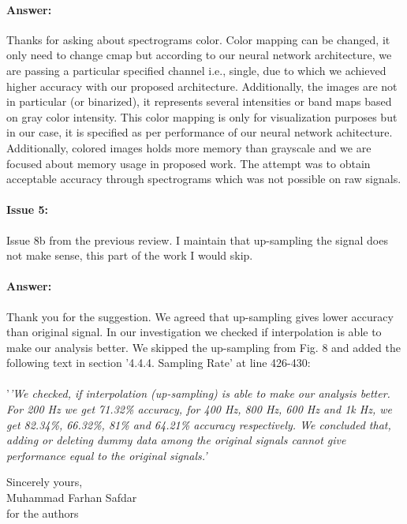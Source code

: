 \documentclass{article}
\begin{document}
\paragraph{Answer:}
Thanks for asking about spectrograms color. Color mapping can be changed, it only need to change cmap but according to our neural network architecture, we are passing a particular specified channel i.e., single, due to which we achieved higher accuracy with our proposed architecture. Additionally, the images are not in particular (or binarized), it represents several intensities or band maps based on gray color intensity. This color mapping is only for visualization purposes but in our case, it is specified as per performance of our neural network achitecture. Additionally, colored images holds more memory than grayscale and we are focused about memory usage in proposed work. The attempt was to obtain acceptable accuracy through spectrograms which was not possible on raw signals. 

\paragraph{Issue 5:}
\begin{displayquote}
Issue 8b from the previous review. I maintain that up-sampling the signal does not make sense, this part of the work I would skip.
\end{displayquote}

\paragraph{Answer:}
Thank you for the suggestion. 
We agreed that up-sampling gives lower accuracy than original signal. In our investigation we checked if interpolation is able to make our analysis better. We skipped the up-sampling from Fig. 8 and added the following text in section '4.4.4. Sampling Rate' at line 426-430:\\\\

 '\textit{'We checked, if interpolation (up-sampling) is able to make our analysis better. For 200 Hz we get 71.32\% accuracy, for 400 Hz, 800 Hz, 600 Hz and 1k Hz, we get 82.34\%, 66.32\%, 81\% and 64.21\% accuracy respectively. We concluded that, adding or deleting dummy data among the original signals cannot give performance equal to the original signals.'}

\vspace{0.25in}

Sincerely yours,\\
Muhammad Farhan Safdar\\
for the authors
\end{document}
